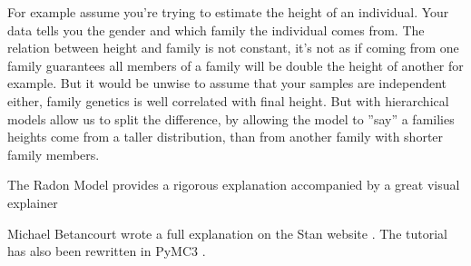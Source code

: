 For example assume you're trying to estimate the height of an individual. Your data tells you the gender and which family the individual comes from. The relation between height and family is not constant, it's not as if coming from one family guarantees all members of a family will be double the height of another for example. But it would be unwise to assume that your samples are independent either, family genetics is well correlated with final height. But with hierarchical models allow us to split the difference, by allowing the model to ''say'' a families heights come from a taller distribution, than from another family with shorter family members.

The Radon Model \cite{PyMC3multilevel2019} provides a rigorous explanation accompanied by a great visual explainer



Michael Betancourt wrote a full explanation on the Stan website \cite{MichaelBetancourtdivergence2017}. The tutorial has also been rewritten in PyMC3 \cite{PyMC3Divergences2019}.



%
%
%
%
%
%
%
%
%
%
%
%
